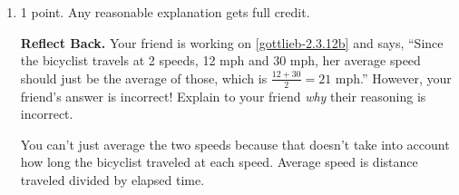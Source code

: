 \documentclass{article}
\begin{document}
\begin{enumerate}
\begin{enumerate}
    \begin{solution}
      Since this is a graph of distance traveled as a function of time, the 
      function should always be increasing,
      and the slope should represent the speed of the cyclist.
      
      When the cyclist is climbing at a constant speed of 12 miles per hour, the graph has slope 12. After this, the graph has slope 30 since the cyclist is going at a constant speed of 30 miles per hour. So, this must be graph .

      We found all the important values in \ref{gottlieb-2.3.12b}:
      \begin{center}
      \end{center}
    \end{solution}

  \item \label{gottlieb-2.3.12b-reflect-back}

    \begin{grading}
      1 point. Any reasonable explanation gets full credit. 
    \end{grading}

    \begin{problem}[\nstretch{0.5}]
      \textbf{Reflect Back.} Your friend is working on
      \ref{gottlieb-2.3.12b} and says, ``Since the bicyclist travels
      at 2 speeds, 12 mph and 30 mph, her average speed should just be
      the average of those, which is $\frac{12 + 30}{2} = 21$ mph.''
      However, your friend's answer is incorrect! Explain to your
      friend \emph{why} their reasoning is incorrect.
    \end{problem}

    \begin{solution}
      You can't just average the two speeds because that doesn't take
      into account how long the bicyclist traveled at each speed.
      Average speed is distance traveled divided by elapsed time.
    \end{solution}


\end{enumerate}
\end{enumerate}
\end{document}
